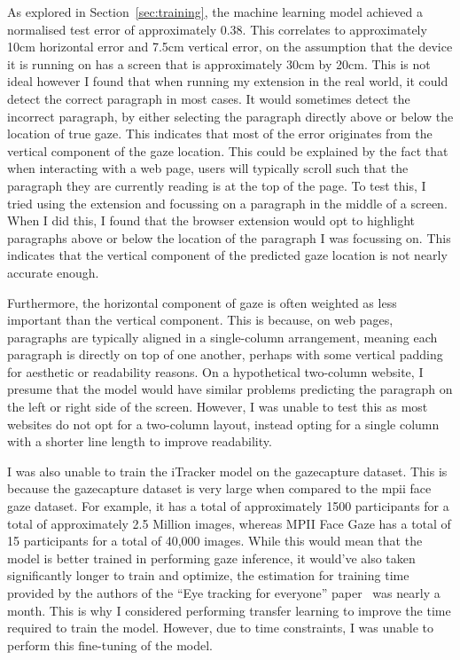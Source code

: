 \documentclass{report}
\begin{document}
As explored in Section~\ref{sec:training}, the machine learning model achieved a normalised test error of approximately 0.38. This correlates to approximately 10cm horizontal error and 7.5cm vertical error, on the assumption that the device it is running on has a screen that is approximately 30cm by 20cm. This is not ideal however I found that when running my extension in the real world, it could detect the correct paragraph in most cases. It would sometimes detect the incorrect paragraph, by either selecting the paragraph directly above or below the location of true gaze. This indicates that most of the error originates from the vertical component of the gaze location. This could be explained by the fact that when interacting with a web page, users will typically scroll such that the paragraph they are currently reading is at the top of the page. To test this, I tried using the extension and focussing on a paragraph in the middle of a screen. When I did this, I found that the browser extension would opt to highlight paragraphs above or below the location of the paragraph I was focussing on. This indicates that the vertical component of the predicted gaze location is not nearly accurate enough. 

Furthermore, the horizontal component of gaze is often weighted as less important than the vertical component. This is because, on web pages, paragraphs are typically aligned in a single-column arrangement, meaning each paragraph is directly on top of one another, perhaps with some vertical padding for aesthetic or readability reasons. On a hypothetical two-column website, I presume that the model would have similar problems predicting the paragraph on the left or right side of the screen. However, I was unable to test this as most websites do not opt for a two-column layout, instead opting for a single column with a shorter line length to improve readability. 

I was also unable to train the iTracker model on the gazecapture dataset. This is because the gazecapture dataset is very large when compared to the mpii face gaze dataset. For example, it has a total of approximately 1500 participants for a total of approximately 2.5 Million images, whereas MPII Face Gaze has a total of 15 participants for a total of 40,000 images. While this would mean that the model is better trained in performing gaze inference, it would've also taken significantly longer to train and optimize, the estimation for training time provided by the authors of the ``Eye tracking for everyone'' paper~\cite{krafka2016eye} was nearly a month. This is why I considered performing transfer learning to improve the time required to train the model. However, due to time constraints, I was unable to perform this fine-tuning of the model.
\end{document}
